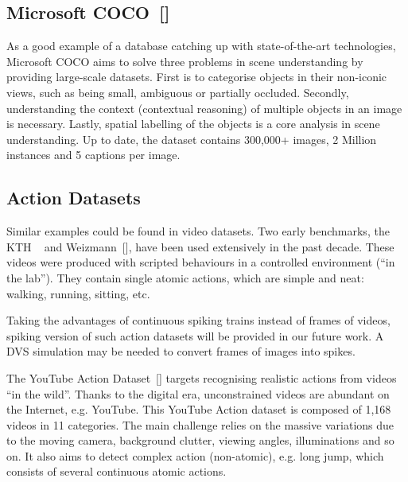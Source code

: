 \subsection{Microsoft COCO~[\cite{lin_microsoft_2014}]}
As a good example of a database catching up with state-of-the-art technologies, Microsoft COCO aims to solve three problems in scene understanding by providing large-scale datasets.
First is to categorise objects in their non-iconic views, such as being small, ambiguous or partially occluded.
Secondly, understanding the context (contextual reasoning) of multiple objects in an image is necessary.
Lastly, spatial labelling of the objects is a core analysis in scene understanding.
Up to date, the dataset contains 300,000+ images, 2 Million instances and 5 captions per image.

\subsection{Action Datasets}
Similar examples could be found in video datasets.
Two early benchmarks, the KTH ~\citep{schuldt2004recognizing} and Weizmann~[\cite{blank2005actions}], have been used extensively in the past decade. 
These videos were produced with scripted behaviours in a controlled environment (``in the lab'').
They contain single atomic actions, which are simple and neat: walking, running, sitting, etc.

Taking the advantages of continuous spiking trains instead of frames of videos, spiking version of such action datasets will be provided in our future work.
A DVS simulation may be needed to convert frames of images into spikes.
 
The YouTube Action Dataset~[\cite{liu_recognizing_2009}] targets recognising realistic actions from videos ``in the wild''.
Thanks to the digital era, unconstrained videos are abundant on the Internet, e.g. YouTube.
This YouTube Action dataset is composed of 1,168 videos in 11 categories.
The main challenge relies on the massive variations due to the moving camera, background clutter, viewing angles, illuminations and so on.
It also aims to detect complex action (non-atomic), e.g. long jump, which consists of several continuous atomic actions.

